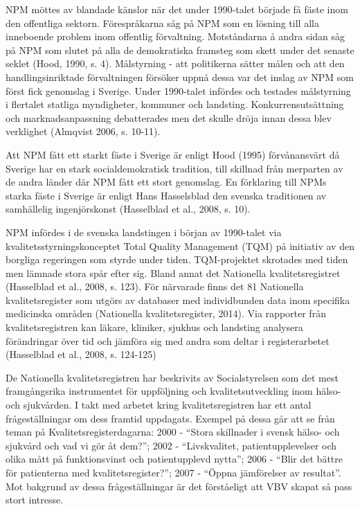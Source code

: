 NPM möttes av blandade känslor när det under 1990-talet började få fäste inom den offentliga sektorn. Förespråkarna såg på NPM som en lösning till alla inneboende problem inom offentlig förvaltning. Motståndarna å andra sidan såg på NPM som slutet på alla de demokratiska framsteg som skett under det senaste seklet (Hood, 1990, s. 4). Målstyrning - att politikerna sätter målen och att den handlingsinriktade förvaltningen försöker uppnå dessa var det inslag av NPM som först fick genomslag i Sverige. Under 1990-talet infördes och testades målstyrning i flertalet statliga myndigheter, kommuner och landsting. Konkurrensutsättning och marknadsanpassning debatterades men det skulle dröja innan dessa blev verklighet (Almqvist 2006, s. 10-11).
 
Att NPM fått ett starkt fäste i Sverige är enligt Hood (1995) förvånansvärt då Sverige har en stark socialdemokratisk tradition, till skillnad från merparten av de andra länder där NPM fått ett stort genomslag. En förklaring till NPMs starka fäste i Sverige är enligt Hans Hasselsblad den svenska traditionen av samhällelig ingenjörskonst (Hasselblad et al., 2008, s. 10).
 
NPM infördes i de svenska landstingen i början av 1990-talet via kvalitetsstyrningskonceptet Total Quality Management (TQM) på initiativ av den borgliga regeringen som styrde under tiden. TQM-projektet skrotades med tiden men lämnade stora spår efter sig. Bland annat det Nationella kvalitetsregistret (Hasselblad et al., 2008, s. 123). För närvarade finns det 81 Nationella kvalitetsregister som utgörs av databaser med individbunden data inom specifika medicinska områden (Nationella kvalitetsregister, 2014). Via rapporter från kvalitetsregistren kan läkare, kliniker, sjukhus och landsting analysera förändringar över tid och jämföra sig med andra som deltar i registerarbetet (Hasselblad et al., 2008, s. 124-125)

De Nationella kvalitetsregistren har beskrivits av Socialstyrelsen som det mest framgångsrika instrumentet för uppföljning och kvalitetsutveckling inom hälso- och sjukvården. I takt med arbetet kring kvalitetsregistren har ett antal frågeställningar om dess framtid uppdagats. Exempel på dessa går att se från teman på Kvalitetsregisterdagarna: 2000 - “Stora skillnader i svensk hälso- och sjukvård och vad vi gör åt dem?”; 2002 - “Livskvalitet, patientupplevelser och olika mått på funktionsvinst och patientupplevd nytta”; 2006 - “Blir det bättre för patienterna med kvalitetsregister?”; 2007 - “Öppna jämförelser av resultat”. Mot bakgrund av dessa frågeställningar är det förståeligt att VBV skapat så pass stort intresse. 

